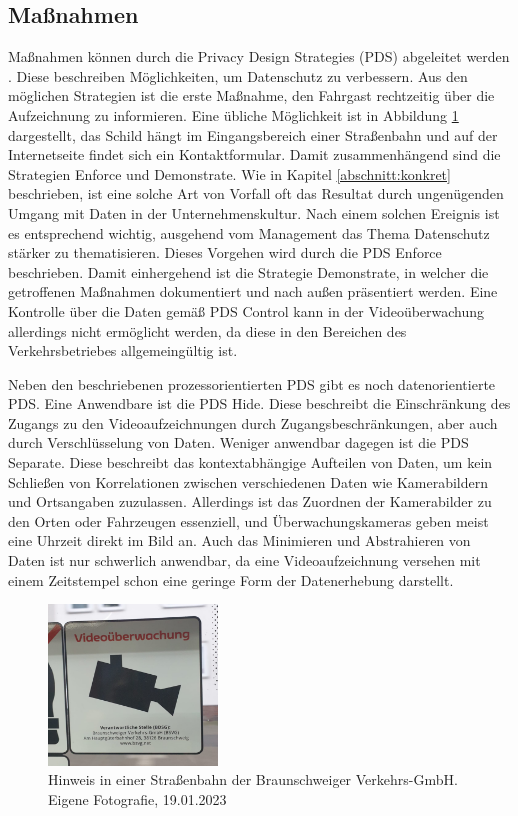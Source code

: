\subsection{Maßnahmen}
\label{abschnitt:massnahmen}
Maßnahmen können durch die \glqq{}Privacy Design Strategies\grqq{} (PDS) abgeleitet werden \cite{Hoepman.2022}. Diese beschreiben Möglichkeiten, um Datenschutz zu verbessern.
Aus den möglichen Strategien ist die erste Maßnahme, den Fahrgast rechtzeitig über die Aufzeichnung zu informieren. Eine übliche Möglichkeit ist in Abbildung \ref{fig:hinweis} dargestellt, das Schild hängt
im Eingangsbereich einer Straßenbahn und auf der Internetseite findet sich ein Kontaktformular. Damit zusammenhängend sind die Strategien \glqq{}Enforce\grqq{} und \glqq{}Demonstrate\grqq{}. Wie in
Kapitel \ref{abschnitt:konkret} beschrieben, ist eine solche Art von Vorfall oft das Resultat durch ungenügenden Umgang mit Daten in der Unternehmenskultur. Nach einem solchen Ereignis ist es entsprechend wichtig,
ausgehend vom Management das Thema Datenschutz stärker zu thematisieren. Dieses Vorgehen wird durch die PDS \glqq{}Enforce\grqq{} beschrieben. Damit einhergehend ist die Strategie \glqq{}Demonstrate\grqq{}, in welcher die getroffenen
Maßnahmen dokumentiert und nach außen präsentiert werden. Eine Kontrolle über die Daten gemäß PDS \glqq{}Control\grqq{} kann in der Videoüberwachung allerdings nicht ermöglicht werden, da diese in den Bereichen
des Verkehrsbetriebes allgemeingültig ist.

Neben den beschriebenen prozessorientierten PDS gibt es noch datenorientierte PDS. Eine Anwendbare ist die PDS \glqq{}Hide\grqq{}. Diese beschreibt die Einschränkung des Zugangs zu den Videoaufzeichnungen durch Zugangsbeschränkungen,
aber auch durch Verschlüsselung von Daten. Weniger anwendbar dagegen ist die PDS \glqq{}Separate\grqq{}. Diese beschreibt das kontextabhängige Aufteilen von Daten, um kein Schließen von Korrelationen zwischen verschiedenen Daten wie
Kamerabildern und Ortsangaben zuzulassen. Allerdings ist das Zuordnen der Kamerabilder zu den Orten oder Fahrzeugen essenziell, und Überwachungskameras geben meist eine Uhrzeit direkt im Bild an.
Auch das Minimieren und Abstrahieren von Daten ist nur schwerlich anwendbar, da eine Videoaufzeichnung versehen mit einem Zeitstempel schon eine geringe Form der Datenerhebung darstellt.
\begin{figure}[ht]
      \begin{center}
            \includegraphics[width= 0.4\textwidth]{Bilder/hinweis.png}
            \caption{Hinweis in einer Straßenbahn der Braunschweiger Verkehrs-GmbH.\\Eigene Fotografie, 19.01.2023}
            \label{fig:hinweis}
      \end{center}
\end{figure}